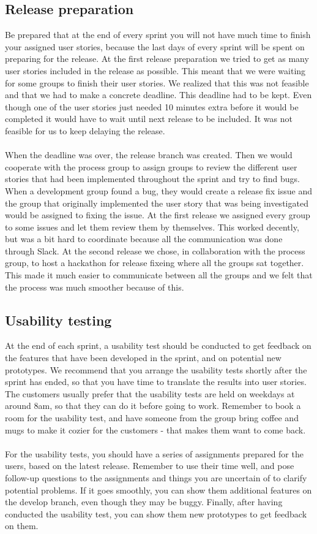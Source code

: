 \subsection{Release preparation}
Be prepared that at the end of every sprint you will not have much time to finish your assigned user stories, because the last days of every sprint will be spent on preparing for the release.
At the first release preparation we tried to get as many user stories included in the release as possible.
This meant that we were waiting for some groups to finish their user stories.
We realized that this was not feasible and that we had to make a concrete deadline.
This deadline had to be kept.
Even though one of the user stories just needed 10 minutes extra before it would be completed it would have to wait until next release to be included.
It was not feasible for us to keep delaying the release.
\\\\
When the deadline was over, the release branch was created.
Then we would cooperate with the process group to assign groups to review the different user stories that had been implemented throughout the sprint and try to find bugs.
When a development group found a bug, they would create a release fix issue and the group that originally implemented the user story that was being investigated would be assigned to fixing the issue.
At the first release we assigned every group to some issues and let them review them by themselves.
This worked decently, but was a bit hard to coordinate because all the communication was done through Slack.
At the second release we chose, in collaboration with the process group, to host a hackathon for release fixeing where all the groups sat together.
This made it much easier to communicate between all the groups and we felt that the process was much smoother because of this.

\subsection{Usability testing}
At the end of each sprint, a usability test should be conducted to get feedback on the features that have been developed in the sprint, and on potential new prototypes.
We recommend that you arrange the usability tests shortly after the sprint has ended, so that you have time to translate the results into user stories.
The customers usually prefer that the usability tests are held on weekdays at around 8am, so that they can do it before going to work.
Remember to book a room for the usability test, and have someone from the group bring coffee and mugs to make it cozier for the customers - that makes them want to come back.
\\\\
For the usability tests, you should have a series of assignments prepared for the users, based on the latest release.
Remember to use their time well, and pose follow-up questions to the assignments and things you are uncertain of to clarify potential problems.
If it goes smoothly, you can show them additional features on the develop branch, even though they may be buggy.
Finally, after having conducted the usability test, you can show them new prototypes to get feedback on them. 

